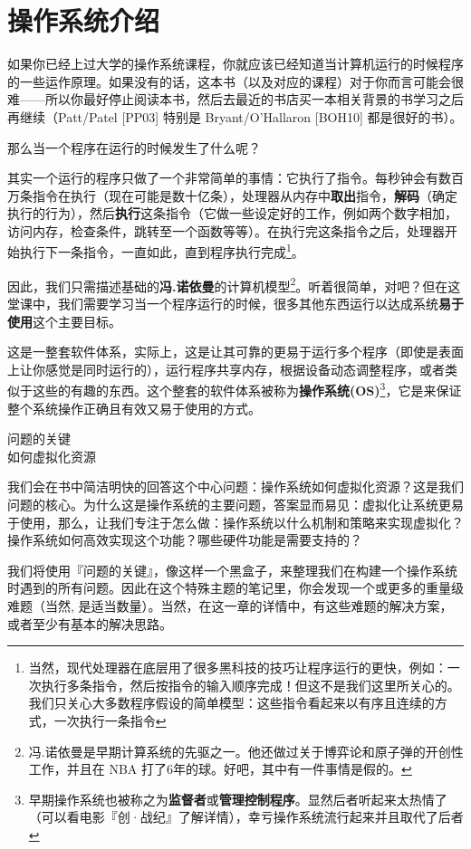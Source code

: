 \chapter{操作系统介绍}
\thispagestyle{empty}

如果你已经上过大学的操作系统课程，你就应该已经知道当计算机运行的时候程序的一些运作原理。如果没有的话，这本书（以及对应的课程）对于你而言可能会很难——所以你最好停止阅读本书，然后去最近的书店买一本相关背景的书学习之后再继续（Patt/Patel [PP03] 特别是 Bryant/O’Hallaron [BOH10] 都是很好的书）。

那么当一个程序在运行的时候发生了什么呢？

其实一个运行的程序只做了一个非常简单的事情：它执行了指令。每秒钟会有数百万条指令在执行（现在可能是数十亿条），处理器从内存中\textbf{取出}指令，\textbf{解码}（确定执行的行为），然后\textbf{执行}这条指令（它做一些设定好的工作，例如两个数字相加，访问内存，检查条件，跳转至一个函数等等）。在执行完这条指令之后，处理器开始执行下一条指令，一直如此，直到程序执行完成\footnote{当然，现代处理器在底层用了很多黑科技的技巧让程序运行的更快，例如：一次执行多条指令，然后按指令的输入顺序完成！但这不是我们这里所关心的。我们只关心大多数程序假设的简单模型：这些指令看起来以有序且连续的方式，一次执行一条指令}。

因此，我们只需描述基础的\textbf{冯.诺依曼}的计算机模型\footnote{冯.诺依曼是早期计算系统的先驱之一。他还做过关于博弈论和原子弹的开创性工作，并且在 NBA 打了6年的球。好吧，其中有一件事情是假的。}。听着很简单，对吧？但在这堂课中，我们需要学习当一个程序运行的时候，很多其他东西运行以达成系统\textbf{易于使用}这个主要目标。

这是一整套软件体系，实际上，这是让其可靠的更易于运行多个程序（即使是表面上让你感觉是同时运行的），运行程序共享内存，根据设备动态调整程序，或者类似于这些的有趣的东西。这个整套的软件体系被称为\textbf{操作系统(OS)}\footnote{早期操作系统也被称之为\textbf{监督者}或\textbf{管理控制程序}。显然后者听起来太热情了（可以看电影『创·战纪』了解详情），幸亏操作系统流行起来并且取代了后者}，它是来保证整个系统操作正确且有效又易于使用的方式。

\begin{tcolorbox}[colframe=grey,colback= grey,arc=0pt,left=6pt,right=6pt,top=6pt,bottom=6pt,boxsep=0pt]
\begin{center}
问题的关键\\
如何虚拟化资源
\end{center}
我们会在书中简洁明快的回答这个中心问题：操作系统如何虚拟化资源？这是我们问题的核心。为什么这是操作系统的主要问题，答案显而易见：虚拟化让系统更易于使用，那么，让我们专注于怎么做：操作系统以什么机制和策略来实现虚拟化？操作系统如何高效实现这个功能？哪些硬件功能是需要支持的？

我们将使用『问题的关键』，像这样一个黑盒子，来整理我们在构建一个操作系统时遇到的所有问题。因此在这个特殊主题的笔记里，你会发现一个或更多的重量级难题（当然, 是适当数量）。当然，在这一章的详情中，有这些难题的解决方案，或者至少有基本的解决思路。
\end{tcolorbox}

